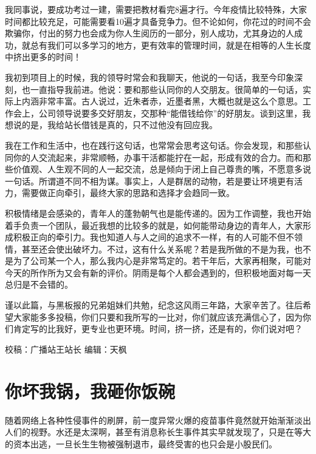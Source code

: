 \documentclass[]{book}
\begin{document}
我同事说，要成功考过一建，需要把教材看完8遍才行。今年疫情比较特殊，大家时间都比较充足，可能需要看10遍才具备竞争力。但不论如何，你花过的时间不会欺骗你，付出的努力也会成为你人生阅历的一部分，别人成功，尤其身边的人成功，就总有我们可以多学习的地方，更有效率的管理时间，就是在相等的人生长度中挤出更多的时间！

我初到项目上的时候，我的领导时常会和我聊天，他说的一句话，我至今印象深刻，也一直指导我前进。他说：要和那些认同你的人交朋友。很简单的一句话，实际上内涵非常丰富。古人说过，近朱者赤，近墨者黑，大概也就是这么个意思。工作会上，公司领导说要多交好朋友，交那种``能借钱给你''的好朋友。谈到这里，我想说的是，我给站长借钱是真的，只不过他没有回应我。

我在工作和生活中，也在践行这句话，也常常会思考这句话。你会发现，和那些认同你的人交流起来，非常顺畅，办事干活都能拧在一起，形成有效的合力。而和那些价值观、人生观不同的人一起交流，总是倾向于闭上自己尊贵的嘴，不愿意多说一句话。所谓道不同不相为谋。事实上，人是群居的动物，若是要让环境更有活力，需要做正向牵引，最终大家的思路和选择才会趋同一致。

积极情绪是会感染的，青年人的蓬勃朝气也是能传递的。因为工作调整，我也开始着手负责一个团队，最近我想的比较多的就是，如何能带动身边的青年人，大家形成积极正向的牵引力。我也知道人与人之间的追求不一样，有的人可能不但不领情，甚至还会使出破坏力。不过，这有什么关系呢？若是我所做的不是为我，也不是为了公司某一个人，那么我内心是非常笃定的。若干年后，大家再相聚，可能对今天的所作所为又会有新的评价。阴雨是每个人都会遇到的，但积极地面对每一天总归是不会错的。

谨以此篇，与黑板报的兄弟姐妹们共勉，纪念这风雨三年路，大家辛苦了。往后希望大家能多多投稿，你们只要和我所写的一比对，你们就应该充满信心了，因为你们肯定写的比我好，更专业也更环境。时间，挤一挤，还是有的，你们说对吧？

校稿：广播站王站长
编辑：天枫

\hypertarget{ux4f60ux574fux6211ux9505ux6211ux7838ux4f60ux996dux7897}{%
\section{你坏我锅，我砸你饭碗}\label{ux4f60ux574fux6211ux9505ux6211ux7838ux4f60ux996dux7897}}

随着网络上各种性侵事件的刷屏，前一度异常火爆的疫苗事件竟然就开始渐渐淡出人们的视野。水还是太深啊，甚至有消息称长生事件其实早就发现了，只是在等大的资本出逃，一旦长生生物被强制退市，最终受害的也只会是小股民们。
\end{document}
